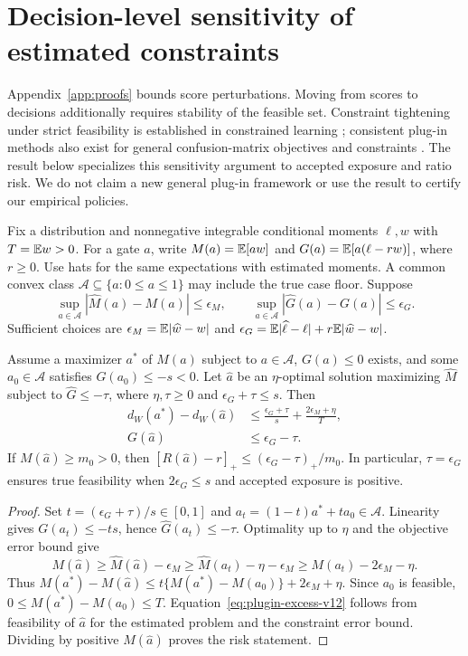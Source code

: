 \section{Decision-level sensitivity of estimated constraints}
\label{app:plugin-v12}
Appendix~\ref{app:proofs} bounds score perturbations. Moving from scores to
decisions additionally requires stability of the feasible set. Constraint
tightening under strict feasibility is established in constrained learning
\citep[Proposition 4.1]{rigollet2011strict}; consistent plug-in methods also
exist for general confusion-matrix objectives and constraints
\citep{tavker2020plugin}. The result below specializes this sensitivity
argument to accepted exposure and ratio risk. We do not claim a new general
plug-in framework or use the result to certify our empirical policies.

Fix a distribution and nonnegative integrable conditional moments $\ell,w$
with $T=\mathbb{E} w>0$. For a gate $a$, write
$M(a)=\mathbb{E}[aw]$ and $G(a)=\mathbb{E}[a(\ell-rw)]$, where $r\geq0$.
Use hats for the same expectations with estimated moments. A common convex
class $\mathcal A\subseteq\{a:0\leq a\leq1\}$ may include the true case floor.
Suppose
\[
 \sup_{a\in\mathcal A}|\widehat M(a)-M(a)|\leq\epsilon_M,
 \qquad
 \sup_{a\in\mathcal A}|\widehat G(a)-G(a)|\leq\epsilon_G.
\]
Sufficient choices are $\epsilon_M=\mathbb{E}|\widehat w-w|$ and
$\epsilon_G=\mathbb{E}|\widehat\ell-\ell|+r\mathbb{E}|\widehat w-w|$.

\begin{proposition}
\label{prop:plugin-v12}
Assume a maximizer $a^*$ of $M(a)$ subject to $a\in\mathcal A$, $G(a)\leq0$
exists, and some $a_0\in\mathcal A$ satisfies $G(a_0)\leq-s<0$.
Let $\widehat a$ be an $\eta$-optimal solution maximizing $\widehat M$
subject to $\widehat G\leq-\tau$, where $\eta,\tau\geq0$ and
$\epsilon_G+\tau\leq s$. Then
\begin{align}
 d_W(a^*)-d_W(\widehat a)
 &\leq\frac{\epsilon_G+\tau}{s}
       +\frac{2\epsilon_M+\eta}{T},\label{eq:plugin-cover-v12}\\
 G(\widehat a)&\leq\epsilon_G-\tau.\label{eq:plugin-excess-v12}
\end{align}
If $M(\widehat a)\geq m_0>0$, then
$[R(\widehat a)-r]_+\leq(\epsilon_G-\tau)_+/m_0$.
In particular, $\tau=\epsilon_G$ ensures true feasibility when
$2\epsilon_G\leq s$ and accepted exposure is positive.
\end{proposition}

\begin{proof}
Set $t=(\epsilon_G+\tau)/s\in[0,1]$ and
$a_t=(1-t)a^*+ta_0\in\mathcal A$. Linearity gives
$G(a_t)\leq-ts$, hence $\widehat G(a_t)\leq-\tau$.
Optimality up to $\eta$ and the objective error bound give
\[
 M(\widehat a)\geq\widehat M(\widehat a)-\epsilon_M
 \geq\widehat M(a_t)-\eta-\epsilon_M
 \geq M(a_t)-2\epsilon_M-\eta.
\]
Thus $M(a^*)-M(\widehat a)\leq
t\{M(a^*)-M(a_0)\}+2\epsilon_M+\eta$.
Since $a_0$ is feasible, $0\leq M(a^*)-M(a_0)\leq T$.
Equation~\eqref{eq:plugin-excess-v12} follows from feasibility of
$\widehat a$ for the estimated problem and the constraint error bound.
Dividing by positive $M(\widehat a)$ proves the risk statement.
\end{proof}


